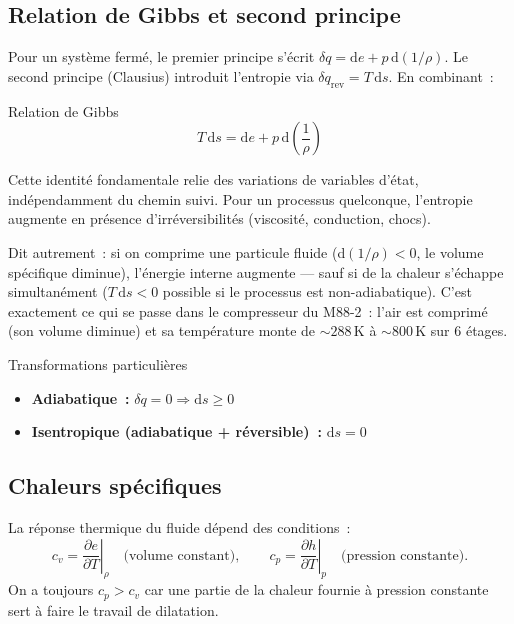 \documentclass[11pt,a4paper]{report}
\newcommand{\pd}[2]{\dfrac{\partial #1}{\partial #2}}
\begin{document}
\subsection{Relation de Gibbs et second principe}

Pour un syst\`eme ferm\'e, le premier principe s'\'ecrit
$\delta q = \mathrm{d}e + p\,\mathrm{d}(1/\rho)$.
Le second principe (Clausius) introduit l'entropie via
$\delta q_{\mathrm{rev}} = T\,\mathrm{d}s$. En combinant~:

\begin{importantbox}{Relation de Gibbs}
\[
  T\,\mathrm{d}s = \mathrm{d}e + p\,\mathrm{d}\!\left(\frac{1}{\rho}\right)
\]
\end{importantbox}

Cette identit\'e fondamentale relie des variations de variables d'\'etat, ind\'ependamment
du chemin suivi. Pour un processus quelconque, l'entropie augmente en pr\'esence
d'irr\'eversibilit\'es (viscosit\'e, conduction, chocs).

Dit autrement~: si on comprime une particule fluide (d$(1/\rho) < 0$, le volume sp\'ecifique diminue), l'\'energie interne augmente --- sauf si de la chaleur s'\'echappe simultan\'ement ($T\,\mathrm{d}s < 0$ possible si le processus est non-adiabatique). C'est exactement ce qui se passe dans le compresseur du M88-2~: l'air est comprim\'e (son volume diminue) et sa temp\'erature monte de $\sim 288\,\mathrm{K}$ \`a $\sim 800\,\mathrm{K}$ sur 6 \'etages.

\begin{defbox}{Transformations particuli\`eres}
\begin{itemize}
  \item \textbf{Adiabatique~:} $\delta q = 0 \Rightarrow \mathrm{d}s \geq 0$
  \item \textbf{Isentropique (adiabatique + r\'eversible)~:} $\mathrm{d}s = 0$
\end{itemize}
\end{defbox}

\subsection{Chaleurs sp\'ecifiques}

La r\'eponse thermique du fluide d\'epend des conditions~:
\[
  c_v = \left.\pd{e}{T}\right|_\rho \quad \text{(volume constant)},
  \qquad
  c_p = \left.\pd{h}{T}\right|_p \quad \text{(pression constante)}.
\]
On a toujours $c_p > c_v$ car une partie de la chaleur fournie \`a pression constante
sert \`a faire le travail de dilatation.
\end{document}
